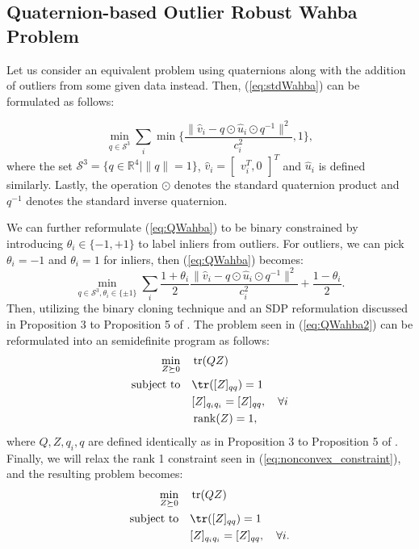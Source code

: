 \documentclass[12pt]{l4dc2021}
\DeclareMathOperator{\trace}{tr}
\DeclareMathOperator{\rank}{rank}
\begin{document}
     \subsection{Quaternion-based Outlier Robust Wahba Problem} \label{subsec:outlierQWahba}
     Let us consider an equivalent problem using quaternions along with the addition of outliers from some given data instead. Then, (\ref{eq:stdWahba}) can be formulated as follows:

     \begin{equation}
         \min_{q \in \mathcal{S}^3} \sum_i \min \bigg\{\frac{\|\hat{v}_i - q \odot \hat{u}_i \odot q^{-1} \|^2}{c_i^2}, 1 \bigg\}, \label{eq:QWahba}
     \end{equation}
     where the set $\mathcal{S}^3= \{q\in\mathbb{R}^4 \mid \|q\|=1 \}$, $\hat{v}_i = \begin{bmatrix}
         v_i^T, 0
     \end{bmatrix}^T$ and $\hat{u}_i$ is defined similarly. Lastly, the operation $\odot$ denotes the standard quaternion product and $q^{-1}$ denotes the standard inverse quaternion. 

     We can further reformulate (\ref{eq:QWahba}) to be binary constrained by introducing $\theta_i \in \{-1,+1\}$ to label inliers from outliers. For outliers, we can pick $\theta_i = -1$ and $\theta_i = 1$ for inliers, then (\ref{eq:QWahba}) becomes:
     \begin{equation}
         \min_{q \in \mathcal{S}^3, \theta_i\in \{\pm 1\}} \sum_i \frac{1+\theta_i}{2}\frac{\|\hat{v}_i - q \odot \hat{u}_i \odot q^{-1} \|^2}{c_i^2} + \frac{1-\theta_i}{2}. \label{eq:QWahba2}
     \end{equation}
    Then, utilizing the binary cloning technique and an SDP reformulation discussed in Proposition 3 to Proposition 5 of \cite{YangWahba}. The problem seen in (\ref{eq:QWahba2}) can be reformulated into an semidefinite program as follows:
    \begin{align}
        \min_{Z \succeq 0} \quad & \trace(QZ) \nonumber\\
        \text{subject to} \quad & \tr([Z]_{qq}) = 1 \nonumber\\
        & [Z]_{q_iq_i} = [Z]_{qq}, \quad \forall i \nonumber\\
        & \rank(Z) = 1 \label{eq:nonconvex_constraint},
    \end{align}
    where $Q,Z,q_i,q$ are defined identically as in Proposition 3 to Proposition 5 of \cite{YangWahba}. Finally, we will relax the rank 1 constraint seen in (\ref{eq:nonconvex_constraint}), and the resulting problem becomes:
    \begin{align}
        \min_{Z \succeq 0} \quad & \trace(QZ) \nonumber\\
        \text{subject to} \quad & \tr([Z]_{qq}) = 1 \nonumber\\
        & [Z]_{q_iq_i} = [Z]_{qq}, \quad \forall i \nonumber.
    \end{align}
\end{document}
